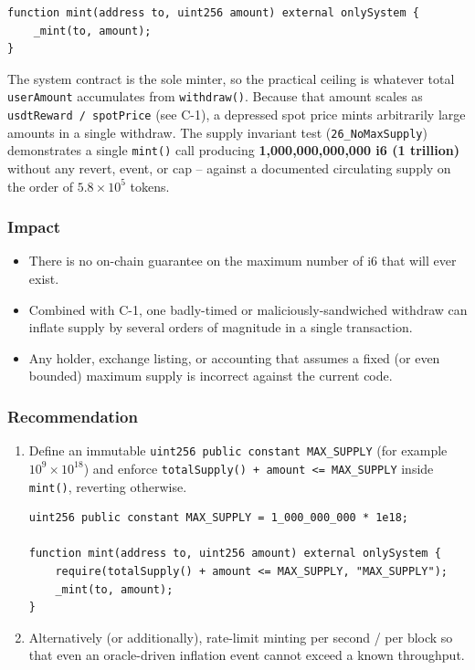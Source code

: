 \documentclass[11pt,a4paper]{article}
\begin{document}
\begin{lstlisting}[caption={\texttt{i6token.sol} -- unbounded mint}]
function mint(address to, uint256 amount) external onlySystem {
    _mint(to, amount);
}
\end{lstlisting}

The system contract is the sole minter, so the practical ceiling is whatever
total \texttt{userAmount} accumulates from \texttt{withdraw()}. Because that
amount scales as \texttt{usdtReward / spotPrice} (see C-1), a depressed
spot price mints arbitrarily large amounts in a single withdraw. The supply
invariant test (\texttt{26\_NoMaxSupply}) demonstrates a single \texttt{mint()}
call producing \textbf{1{,}000{,}000{,}000{,}000 i6 (1 trillion)} without any
revert, event, or cap -- against a documented circulating supply on the order
of $5.8 \times 10^{5}$ tokens.

\subsubsection*{Impact}

\begin{itemize}[leftmargin=*]
    \item There is no on-chain guarantee on the maximum number of i6 that
          will ever exist.
    \item Combined with C-1, one badly-timed or maliciously-sandwiched
          withdraw can inflate supply by several orders of magnitude in a
          single transaction.
    \item Any holder, exchange listing, or accounting that assumes a fixed
          (or even bounded) maximum supply is incorrect against the
          current code.
\end{itemize}

\subsubsection*{Recommendation}

\begin{enumerate}[leftmargin=*]
    \item Define an immutable
          \texttt{uint256 public constant MAX\_SUPPLY} (for example
          $10^{9}\times 10^{18}$) and enforce
          \texttt{totalSupply() + amount <= MAX\_SUPPLY} inside
          \texttt{mint()}, reverting otherwise. \\

\begin{lstlisting}[caption={Recommended cap}]
uint256 public constant MAX_SUPPLY = 1_000_000_000 * 1e18;

function mint(address to, uint256 amount) external onlySystem {
    require(totalSupply() + amount <= MAX_SUPPLY, "MAX_SUPPLY");
    _mint(to, amount);
}
\end{lstlisting}

    \item Alternatively (or additionally), rate-limit minting per second
          / per block so that even an oracle-driven inflation event cannot
          exceed a known throughput.
\end{enumerate}
\end{document}
